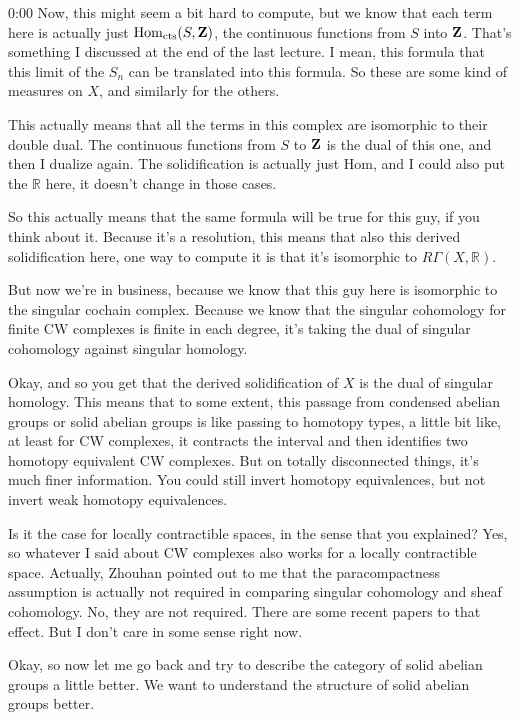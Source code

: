 \begin{unfinished}{0:00}
Now, this might seem a bit hard to compute, but we know that each term here is actually just $\mathrm{Hom}_{\mathrm{cts}}(S, \mathbf Z)$, the continuous functions from $S$ into $\mathbf Z$. That's something I discussed at the end of the last lecture. I mean, this formula that this limit of the $S_n$ can be translated into this formula. So these are some kind of measures on $X$, and similarly for the others.

This actually means that all the terms in this complex are isomorphic to their double dual. The continuous functions from $S$ to $\mathbf Z$ is the dual of this one, and then I dualize again. The solidification is actually just $\mathrm{Hom}$, and I could also put the $\mathbb{R}$ here, it doesn't change in those cases.

So this actually means that the same formula will be true for this guy, if you think about it. Because it's a resolution, this means that also this derived solidification here, one way to compute it is that it's isomorphic to $R\Gamma(X, \mathbb{R})$.

But now we're in business, because we know that this guy here is isomorphic to the singular cochain complex. Because we know that the singular cohomology for finite CW complexes is finite in each degree, it's taking the dual of singular cohomology against singular homology.

Okay, and so you get that the derived solidification of $X$ is the dual of singular homology. This means that to some extent, this passage from condensed abelian groups or solid abelian groups is like passing to homotopy types, a little bit like, at least for CW complexes, it contracts the interval and then identifies two homotopy equivalent CW complexes. But on totally disconnected things, it's much finer information. You could still invert homotopy equivalences, but not invert weak homotopy equivalences.

Is it the case for locally contractible spaces, in the sense that you explained? Yes, so whatever I said about CW complexes also works for a locally contractible space. Actually, Zhouhan pointed out to me that the paracompactness assumption is actually not required in comparing singular cohomology and sheaf cohomology. No, they are not required. There are some recent papers to that effect. But I don't care in some sense right now.

Okay, so now let me go back and try to describe the category of solid abelian groups a little better. We want to understand the structure of solid abelian groups better.


\end{unfinished}

